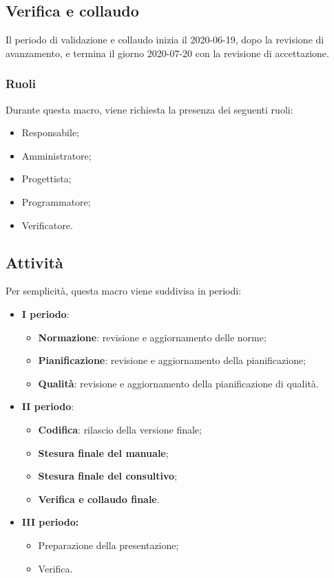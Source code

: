\documentclass[../piano-di-progetto.tex]{subfiles}
\begin{document}
\subsection{Verifica e collaudo}
Il periodo di validazione e collaudo inizia il 2020-06-19, dopo la revisione di avanzamento, e termina il giorno 2020-07-20 con la revisione di accettazione. 

\subsubsection{Ruoli}
Durante questa macro, viene richiesta la presenza dei seguenti ruoli:
\begin{itemize}
    \item Responsabile;
    \item Amministratore;
    \item Progettista;
    \item Programmatore;
    \item Verificatore.
\end{itemize}

\subsection{Attività}
Per semplicità, questa macro viene suddivisa in periodi:

\begin{itemize}
    \item \textbf{I periodo}:
        \begin{itemize}
            \item \textbf{Normazione}: revisione e aggiornamento delle norme;
            \item \textbf{Pianificazione}: revisione e aggiornamento della pianificazione;
            \item \textbf{Qualità}: revisione e aggiornamento della pianificazione di qualità.
        \end{itemize}
    \item \textbf{II periodo}:
        \begin{itemize}
            \item \textbf{Codifica}: rilascio della versione finale;
            \item \textbf{Stesura finale del manuale};
            \item \textbf{Stesura finale del consultivo};
            \item \textbf{Verifica e collaudo finale}.
        \end{itemize}
    \item \textbf{III periodo:}
        \begin{itemize}
            \item Preparazione della presentazione;
            \item Verifica.
        \end{itemize}
\end{itemize}
\end{document}
